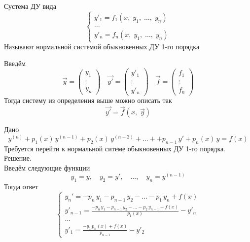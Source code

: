 \begin{Def}
    Сустема ДУ вида
    \[
        \begin{cases}
            y'_1 = f_1(x,\; y_1,\; \dots,\; y_n)\\
            \dots\\
            y'_n = f_n(x,\; y_1,\; \dots,\; y_n)
        \end{cases}
    \]
    Называют нормальной системой обыкновенных ДУ 1-го порядка
\end{Def}

\begin{Note}
    Введём 
    \[
        \vec{y} = \begin{pmatrix} y_1\\ \vdots\\ y_n \end{pmatrix} \quad \vec{y'} = \begin{pmatrix} y'_1\\ \vdots\\ y'_n \end{pmatrix} \quad \vec{f} = \begin{pmatrix} f_1\\ \vdots\\ f_n \end{pmatrix}
    \]
    Тогда систему из определения выше можно описать так
    \[
        \vec{y'} = \vec{f}(x,\; \vec{y})
    \]
\end{Note}

\begin{Example}
    Дано
    \[
        y^{(n)} + p_1(x)\,y^{(n-1)} + p_2(x)\,y^{(n-2)} + \dots + + p_{n-1}\,y' + p_n(x)\,y = f(x)
    \]
    Требуется перейти к нормальной ситеме обыкновенных ДУ 1-го порядка.\\
    Решение.\\
    Введём следующие функции
    \[
        y_1 = y, \quad y_2 = y', \quad \dots, \quad y_n = y^{(n-1)}
    \]
    Тогда ответ
    \[
        \begin{cases}
            y_n' = -p_n\,y_1 - p_{n-1}\,y_2 - \dots - p_1\,y_n + f(x)\\
            y'_{n-1} = \frac{-p_n\,y_1 - p_{n-1}\,y_2 - \dots - p_2\,y_{n-1} + f(x)}{p_1(x)} - y'_n\\
            \dots\\
            y'_1 = \frac{- y_1\,p_n(x) + f(x)}{p_{n-1}} - y'_2
        \end{cases}
    \]
\end{Example}

